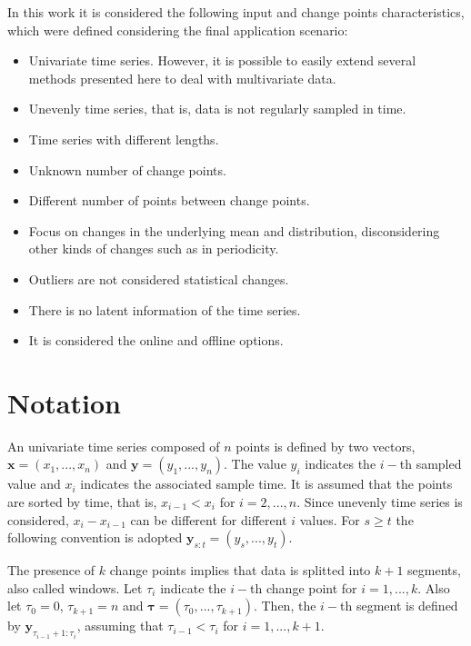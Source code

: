 In this work it is considered the following input and change points characteristics, which were defined considering the final application scenario:
\begin{itemize}
    \item Univariate time series. However, it is possible to easily extend several methods presented here to deal with multivariate data.
    \item Unevenly time series, that is, data is not regularly sampled in time.
    \item Time series with different lengths.
    \item Unknown number of change points.
    \item Different number of points between change points.
    \item Focus on changes in the underlying mean and distribution, disconsidering other kinds of changes such as in periodicity.
    \item Outliers are not considered statistical changes.
    \item There is no latent information of the time series.
    \item It is considered the online and offline options.
\end{itemize}

\section{Notation}

An univariate time series composed of $n$ points is defined by two vectors, $\mathbf{x} = (x_{1}, ..., x_{n})$ and $\mathbf{y} = (y_{1}, ..., y_{n})$. The value $y_{i}$ indicates the $i-$th sampled value and $x_{i}$ indicates the associated sample time. It is assumed that the points are sorted by time, that is, $x_{i - 1} < x_{i}$ for $i = 2, ..., n$. Since unevenly time series is considered, $x_{i} - x_{i - 1}$ can be different for different $i$ values. For $s \ge t$ the following convention is adopted $\mathbf{y}_{s:t} = (y_{s}, ..., y_{t})$.

The presence of $k$ change points implies that data is splitted into $k+1$ segments, also called windows. Let $\tau_{i}$ indicate the $i-$th change point for $i=1,...,k$. Also let $\tau_{0} = 0$, $\tau_{k + 1} = n$ and $\boldsymbol \tau = (\tau_{0}, ..., \tau_{k + 1})$. Then, the $i-$th segment is defined by $\mathbf{y}_{\tau_{i - 1} + 1 : \tau_{i}}$, assuming that $\tau_{i - 1} < \tau_{i}$ for $i = 1, ..., k + 1$.

